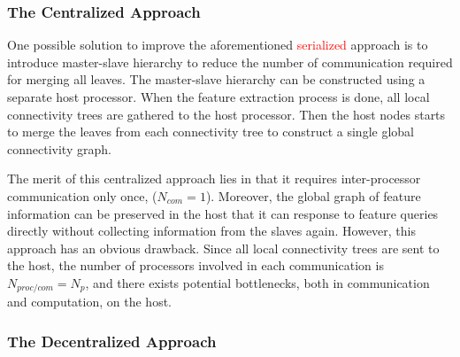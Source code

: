 
\subsubsection{The Centralized Approach}

One possible solution to improve the aforementioned \textcolor{red}{serialized} approach is to introduce master-slave hierarchy to reduce the number of communication required for merging all leaves. The master-slave hierarchy can be constructed using a separate host processor. When the feature extraction process is done, all local connectivity trees are gathered to the host processor. Then the host nodes starts to merge the leaves from each connectivity tree to construct a single global connectivity graph.

The merit of this centralized approach lies in that it requires inter-processor communication only once, ($N_{com} = 1$). Moreover, the global graph of feature information can be preserved in the host that it can response to feature queries directly without collecting information from the slaves again. However, this approach has an obvious drawback. Since all local connectivity trees are sent to the host, the number of processors involved in each communication is $N_{proc/com} = N_p$, and there exists potential bottlenecks, both in communication and computation, on the host.

\subsubsection{The Decentralized Approach}

